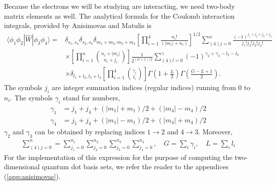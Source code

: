 Because the electrons we will be studying are interacting, we need two-body matrix elements 
as well. The analytical formula for the Coulomb interaction integrals, provided by Anisimovas and 
Matulis\cite{anisimovas1998energy} is
\begin{equation}
    \begin{aligned}
        \langle \phi_1\phi_2| \hat{W} | \phi_3\phi_4 \rangle =& 
        \delta_{s_1, s_4} \delta_{s_2, s_3} \delta_{m_1 + m_2, m_3 + m_4}
        \left[\prod_{i=1}^4 \frac{n_i!}{(|m_i| + n_i)} \right]^{1/2}
        \sum_{(4)j=0}^n \frac{(-1)^{j_1+j_2+j_3+j_4}}{j_1!j_2!j_3!j_4!} \\
        &\times \left[\prod_{i=1}^n \binom{n_i + |m_i|} {n_i + j_i} \right]
        \frac{1}{2^{(G+1)/2}} \sum_{(4)l=0}^\gamma (-1)^{\gamma_2 + \gamma_3 - l_2 - l_3} \\
        &\times \delta_{l_1 + l_2, l_3 + l_4} \left[\prod_{i=1}^4 \binom{\gamma_i}{l_i} \right] 
        \Gamma\left(1 + \frac{L}{2} \right)\Gamma\left(\frac{G - L + 1}{2}\right).
    \end{aligned}
\end{equation}
The symbols $j_i$ are integer summation indices (regular indices) running from $0$ to $n_i$.
The symbols $\gamma_i$ stand for numbers,
\begin{align*}
\gamma_1 &= j_1 + j_4 + (|m_1| + m_1)/2 + (|m_4| - m_4)/2 \\
\gamma_4 &= j_1 + j_4 + (|m_1| - m_1)/2 + (|m_4| + m_4)/2
\end{align*}
$\gamma_2$ and $\gamma_3$ can be obtained by replacing indices $1 \to 2$ and $4 \to 3$.
Moreover,
\begin{align*}
\sum_{(4)j=0}^n =
\sum_{j_1=0}^{n_1}\sum_{j_2=0}^{n_2}\sum_{j_3=0}^{n_3}\sum_{j_4=0}^{n_4},
\quad 
G = \sum_i \gamma_i, 
\quad
L = \sum_i l_i
\end{align*}
For the implementation of this expression for the purpose of computing the two-dimensional 
quantum dot basis sets, we refer the reader to the appendices (\autoref{app:anisimovas}).

